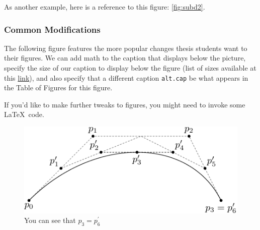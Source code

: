 \documentclass[12pt,twoside]{amherstthesis}
\begin{document}
  As another example, here is a reference to this figure:
  \autoref{fig:subd2}.
  
  \subsubsection{Common Modifications}\label{common-modifications}
  
  The following figure features the more popular changes thesis students
  want to their figures. We can add math to the caption that displays
  below the picture, specify the size of our caption to display below the
  figure (list of sizes available at this
  \href{http://www.emerson.emory.edu/services/latex/latex_169.html\#SEC169}{link}),
  and also specify that a different caption \texttt{alt.cap} be what
  appears in the Table of Figures for this figure.
  
  If you'd like to make further tweaks to figures, you might need to
  invoke some \LaTeX~code.
  
  \begin{Shaded}
  \begin{Highlighting}[]
  \NormalTok{(}\NormalTok{, }
         \NormalTok{,}
         \CharTok{\textbackslash{}\textbackslash{}}\NormalTok{,}
         \NormalTok{,}
         \NormalTok{)}
  \end{Highlighting}
  \end{Shaded}
  
  \begin{figure}[htbp]
  \centering
  \includegraphics[scale = 1,angle = 0]{figure/subdivision.pdf}
  \caption[Subdivision of arc segments]{\footnotesize{You can see that $p_3 = p_6^\prime$}}
  \label{fig:subd3}
  \end{figure}
  
\end{document}
